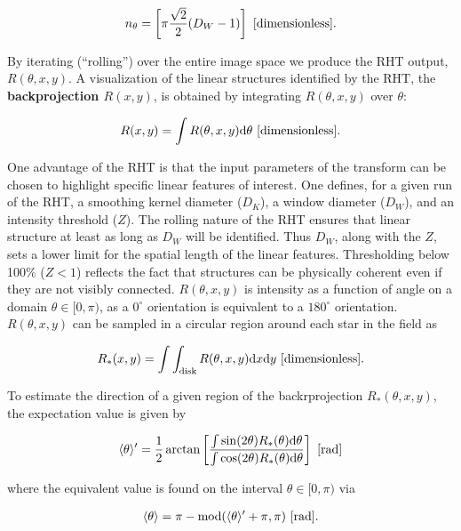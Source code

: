 \documentclass[a4paper,10pt]{article}
\begin{document}
\begin{align*}
    n_\theta = \left[\pi\frac{\sqrt{2}}{2}(D_W-1)\right] ~ [{\rm dimensionless}].
\end{align*}

{\noindent}By iterating (``rolling'') over the entire image space we produce the RHT output, $R(\theta,x,y)$. A visualization of the linear structures identified by the RHT, the \textbf{backprojection $R(x,y)$}, is obtained by integrating $R(\theta,x,y)$ over $\theta$:

\begin{align*}
    R(x,y) = \int R(\theta,x,y)\mathrm{d}\theta ~ [{\rm dimensionless}].
\end{align*}

{\noindent}One advantage of the RHT is that the input parameters of the transform can be chosen to highlight specific linear features of interest. One defines, for a given run of the RHT, a smoothing kernel diameter ($D_K$), a window diameter ($D_W$), and an intensity threshold ($Z$). The rolling nature of the RHT ensures that linear structure at least as long as $D_W$ will be identified. Thus $D_W$, along with the $Z$, sets a lower limit for the spatial length of the linear features. Thresholding below 100\% ($Z<1$) reflects the fact that structures can be physically coherent even if they are not visibly connected. $R(\theta,x,y)$ is intensity as a function of angle on a domain $\theta\in[0,\pi)$, as a $0^\circ$ orientation is equivalent to a $180^\circ$ orientation. $R(\theta,x,y)$ can be sampled in a circular region around each star in the field as

\begin{align*}
    R_*(x,y) = \int\int_\mathrm{disk} R(\theta,x,y)\mathrm{d}x\mathrm{d}y ~ [{\rm dimensionless}].
\end{align*}

{\noindent}To estimate the direction of a given region of the backrprojection $R_*(\theta,x,y)$, the expectation value is given by

\begin{align*}
    \langle\theta\rangle' = \frac{1}{2}\arctan \left[\frac{\int\sin(2\theta)R_*(\theta)\mathrm{d}\theta}{\int\cos(2\theta)R_*(\theta)\mathrm{d}\theta}\right] ~ [{\rm rad}]
\end{align*}

{\noindent}where the equivalent value is found on the interval $\theta\in[0,\pi)$ via

\begin{align*}
    \langle\theta\rangle = \pi - {\rm mod}(\langle\theta\rangle'+\pi,\pi) ~ [{\rm rad}].
\end{align*}
\end{document}
